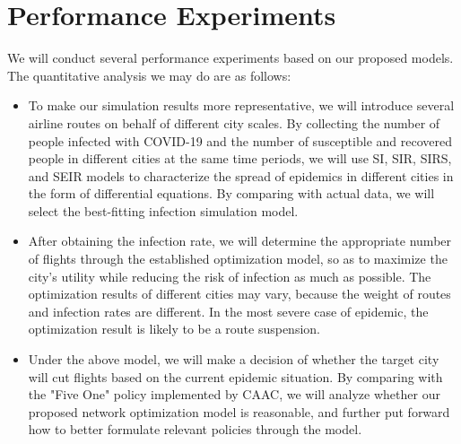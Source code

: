 \section{Performance Experiments}

We will conduct several performance experiments based on our proposed models. The quantitative analysis we may do are as follows:
\begin{itemize}
    \item To make our simulation results more representative, we will introduce several airline routes on behalf of different city scales. By collecting the number of people infected with COVID-19 and the number of susceptible and recovered people in different cities at the same time periods, we will use SI, SIR, SIRS, and SEIR models to characterize the spread of epidemics in different cities in the form of differential equations. By comparing with actual data, we will select the best-fitting infection simulation model.
    \item After obtaining the infection rate, we will determine the appropriate number of flights through the established optimization model, so as to maximize the city's utility while reducing the risk of infection as much as possible. The optimization results of different cities may vary, because the weight of routes and infection rates are different. In the most severe case of epidemic, the optimization result is likely to be a route suspension.
    \item Under the above model, we will make a decision of whether the target city will cut flights based on the current epidemic situation. By comparing with the "Five One" policy implemented by CAAC, we will analyze whether our proposed network optimization model is reasonable, and further put forward how to better formulate relevant policies through the model.
\end{itemize}

